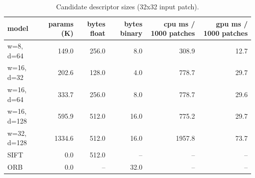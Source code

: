 \begin{table}
\caption{Candidate descriptor sizes (32x32 input patch).}
\label{tab:sizes}
\begin{tabular}{lrrrrr}
\toprule
model & params (K) & bytes float & bytes binary & cpu ms / 1000 patches & gpu ms / 1000 patches \\
\midrule
w=8, d=64 & 149.0 & 256.0 & 8.0 & 308.9 & 12.7 \\
w=16, d=32 & 202.6 & 128.0 & 4.0 & 778.7 & 29.7 \\
w=16, d=64 & 333.7 & 256.0 & 8.0 & 778.7 & 29.6 \\
w=16, d=128 & 595.9 & 512.0 & 16.0 & 775.2 & 29.7 \\
w=32, d=128 & 1334.6 & 512.0 & 16.0 & 1957.8 & 73.7 \\
SIFT & 0.0 & 512.0 & -- & -- & -- \\
ORB & 0.0 & -- & 32.0 & -- & -- \\
\bottomrule
\end{tabular}
\end{table}
